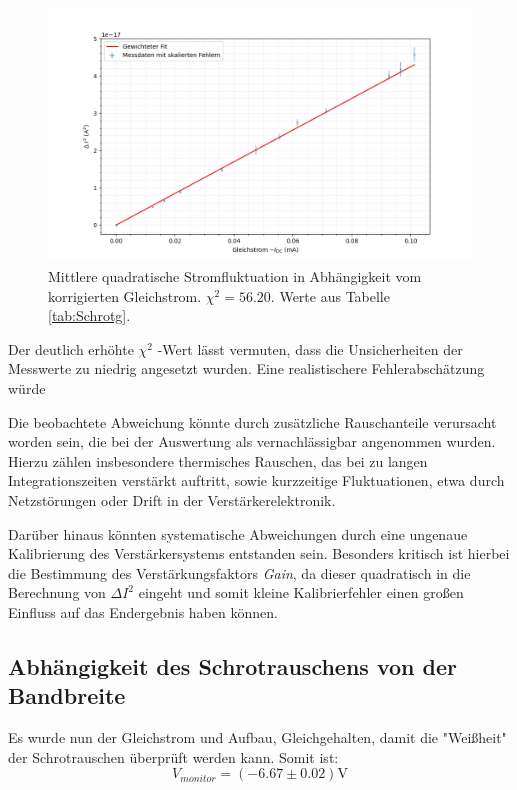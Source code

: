 \begin{figure}[htbp]
    \centering
    \includegraphics[width=1\textwidth]{figs/schrotgleich_5.png}
    \caption{Mittlere quadratische Stromfluktuation in Abhängigkeit vom korrigierten Gleichstrom. \(\chi^2 = 56.20\). Werte aus Tabelle \ref{tab:Schrotg}.}
    \label{fig:schrotgleich}
\end{figure}


Der deutlich erhöhte \(\chi^2\) -Wert lässt vermuten, dass die Unsicherheiten der Messwerte zu niedrig angesetzt wurden. Eine realistischere Fehlerabschätzung würde 

Die beobachtete Abweichung könnte durch zusätzliche Rauschanteile verursacht worden sein, die bei der Auswertung als vernachlässigbar angenommen wurden. Hierzu zählen insbesondere thermisches Rauschen, das bei zu langen Integrationszeiten verstärkt auftritt, sowie kurzzeitige Fluktuationen, etwa durch Netzstörungen oder Drift in der Verstärkerelektronik. 

Darüber hinaus könnten systematische Abweichungen durch eine ungenaue Kalibrierung des Verstärkersystems entstanden sein. Besonders kritisch ist hierbei die Bestimmung des Verstärkungsfaktors \textit{Gain}, da dieser quadratisch in die Berechnung von $\Delta I^2$ eingeht und somit kleine Kalibrierfehler einen großen Einfluss auf das Endergebnis haben können.


\subsection{Abhängigkeit des Schrotrauschens von der Bandbreite}

Es wurde nun der Gleichstrom und Aufbau, Gleichgehalten, damit die "Weißheit" der Schrotrauschen überprüft werden kann.
Somit ist:
\begin{equation*}
    V_{monitor} = (-6.67 \pm 0.02) \si{\volt}
\end{equation*}

